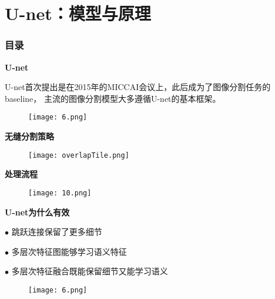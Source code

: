 \section{U-net：模型与原理}
\begin{frame}[allowframebreaks]
  \frametitle{\textsc{目录}} \vspace{-0.3cm}
    \begin{spacing}{0.0}
    \end{spacing}   %
\end{frame}



\begin{frame}
    \noindent\large\textbf{U-net}

    \vspace{1em}
    U-net首次提出是在2015年的MICCAI会议上，此后成为了图像分割任务的baseline，
    主流的图像分割模型大多遵循U-net的基本框架。

    \begin{figure}
        \texttt{[image: 6.png]}
    \end{figure}
\end{frame}

\begin{frame}
    \noindent\large\textbf{无缝分割策略}

    \vspace{1em}

    \begin{figure}
        \texttt{[image: overlapTile.png]}
    \end{figure}
\end{frame}

\begin{frame}
    \noindent\large\textbf{处理流程}

    \vspace{1em}
    \begin{figure}
        \texttt{[image: 10.png]}
    \end{figure}
\end{frame}

\begin{frame}
    \noindent\large\textbf{U-net为什么有效}

    \vspace{1em}
    $\bullet$ 跳跃连接保留了更多细节

    \vspace{1em}
    $\bullet$ 多层次特征图能够学习语义特征

    \vspace{1em}
    $\bullet$ 多层次特征融合既能保留细节又能学习语义

    \begin{figure}
        \centering
        \texttt{[image: 6.png]}
    \end{figure}


\end{frame}

